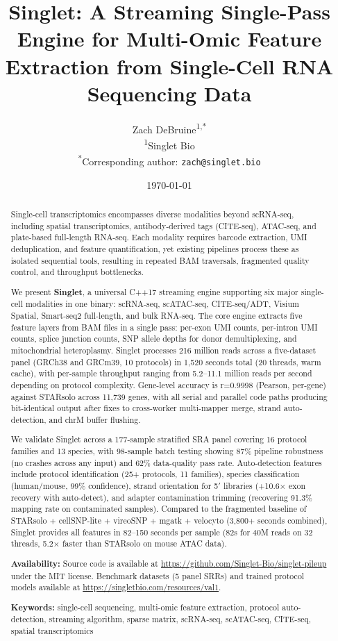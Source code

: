 \documentclass[11pt,a4paper]{article}
\title{\textbf{Singlet: A Streaming Single-Pass Engine for Multi-Omic Feature Extraction from Single-Cell RNA Sequencing Data}}
\author{
  Zach DeBruine\textsuperscript{1,*} \\[6pt]
  \textsuperscript{1}Singlet Bio \\
  \textsuperscript{*}Corresponding author: \texttt{zach@singlet.bio}
}
\date{\today}
\begin{document}
\maketitle

\begin{abstract}
Single-cell transcriptomics encompasses diverse modalities beyond scRNA-seq, including spatial transcriptomics, antibody-derived tags (CITE-seq), ATAC-seq, and plate-based full-length RNA-seq. Each modality requires barcode extraction, UMI deduplication, and feature quantification, yet existing pipelines process these as isolated sequential tools, resulting in repeated BAM traversals, fragmented quality control, and throughput bottlenecks.

We present \textbf{Singlet}, a universal C++17 streaming engine supporting six major single-cell modalities in one binary: scRNA-seq, scATAC-seq, CITE-seq/ADT, Visium Spatial, Smart-seq2 full-length, and bulk RNA-seq. The core engine extracts five feature layers from BAM files in a single pass: per-exon UMI counts, per-intron UMI counts, splice junction counts, SNP allele depths for donor demultiplexing, and mitochondrial heteroplasmy. Singlet processes 216 million reads across a five-dataset panel (GRCh38 and GRCm39, 10 protocols) in 1,520 seconds total (20 threads, warm cache), with per-sample throughput ranging from 5.2--11.1 million reads per second depending on protocol complexity. Gene-level accuracy is r=0.9998 (Pearson, per-gene) against STARsolo across 11,739 genes, with all serial and parallel code paths producing bit-identical output after fixes to cross-worker multi-mapper merge, strand auto-detection, and chrM buffer flushing.

We validate Singlet across a 177-sample stratified SRA panel covering 16 protocol families and 13 species, with 98-sample batch testing showing 87\% pipeline robustness (no crashes across any input) and 62\% data-quality pass rate. Auto-detection features include protocol identification (25+ protocols, 11 families), species classification (human/mouse, 99\% confidence), strand orientation for 5$'$ libraries (+10.6× exon recovery with auto-detect), and adapter contamination trimming (recovering 91.3\% mapping rate on contaminated samples). Compared to the fragmented baseline of STARsolo + cellSNP-lite + vireoSNP + mgatk + velocyto (3,800+ seconds combined), Singlet provides all features in 82--150 seconds per sample (82s for 40M reads on 32 threads, 5.2× faster than STARsolo on mouse ATAC data).

\noindent \textbf{Availability:} Source code is available at \url{https://github.com/Singlet-Bio/singlet-pileup} under the MIT license. Benchmark datasets (5 panel SRRs) and trained protocol models available at \url{https://singletbio.com/resources/val1}.

\noindent \textbf{Keywords:} single-cell sequencing, multi-omic feature extraction, protocol auto-detection, streaming algorithm, sparse matrix, scRNA-seq, scATAC-seq, CITE-seq, spatial transcriptomics
\end{abstract}
\end{document}
